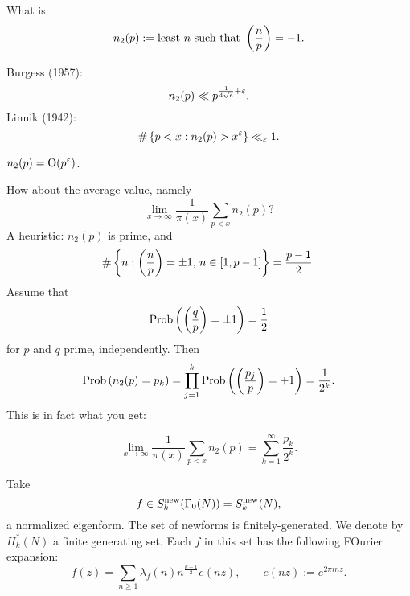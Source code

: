 \documentclass[reqno]{amsart} 
\begin{document}
\begin{question}
  What is
  \begin{equation*}
    n_2(p) := \text{least $n$ such that }
    \left( \frac{n}{p} \right) = -1.
  \end{equation*}
\end{question}
Burgess (1957):
\begin{equation*}
  n_2 (p) \ll p^{\frac{1}{4 \sqrt{e}} + \varepsilon }.
\end{equation*}
Linnik (1942):
\begin{equation*}
  \# \left\{ p < x : n_2(p) > x^\varepsilon  \right\} \ll_\varepsilon 1.
\end{equation*}
\begin{conjecture}[Vinogradov]
  $n_2(p) = \operatorname{O}(p^\varepsilon )$.
\end{conjecture}
How about the average value, namely
\begin{equation*}
  \lim_{x \rightarrow \infty } \frac{1}{ \pi (x) }
  \sum_{p < x} n_2 (p)?  
\end{equation*}
A heuristic: $n_2(p)$ is prime, and
\begin{equation*}
  \# \left\{ n : \left( \frac{n}{p} \right) = \pm 1, \, n \in [1, p - 1] \right\}
  = \frac{p - 1}{2}.
\end{equation*}
Assume that
\begin{equation*}
  \operatorname{Prob} \left( \left( \frac{q}{p} \right) = \pm 1 \right)
  = \frac{1}{2} 
\end{equation*}
for $p$ and $q$ prime, independently.  Then
\begin{equation*}
  \operatorname{Prob}\left( n_2(p) = p_k \right)
  =
  \prod_{j=1}^k
  \operatorname{Prob}
  \left(
    \left( \frac{p_j}{p} \right) = + 1
  \right)
  = \frac{1}{2^k}.
\end{equation*}
This is in fact what you get:
\begin{theorem}[Erdos 1961]
  \begin{equation*}
    \lim_{x \rightarrow \infty }
    \frac{1}{  \pi(x)} \sum_{p < x } n_2 (p)
    = \sum_{k = 1 }^\infty \frac{p_k }{ 2^k }.
  \end{equation*}
\end{theorem}
Take
\begin{equation*}
  f \in S_k^{\operatorname{new}} (\Gamma_0 (N) ) = S_k^{\operatorname{new}} (N),
\end{equation*}
a normalized eigenform.  The set of newforms is finitely-generated.  We denote by $H_k^\ast (N) $ a finite generating set.  Each $f$ in this set has the following FOurier expansion:
\begin{equation*}
  f (z) = \sum_{n \geq 1 } \lambda_f (n) n^{\frac{k - 1 }{2}} e (n z),
  \qquad
  e (n z ) := e^{2 \pi i n z }.
\end{equation*}
\end{document}
